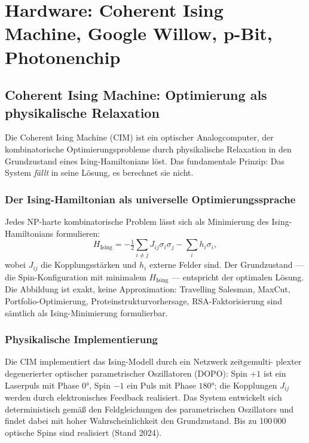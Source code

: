 \chapter{Hardware: Coherent Ising Machine, Google Willow, p-Bit, Photonenchip}
\label{ch:hardware}

\section{Coherent Ising Machine: Optimierung als physikalische Relaxation}

Die Coherent Ising Machine (CIM) ist ein optischer Analogcomputer, der
kombinatorische Optimierungsprobleme durch physikalische Relaxation in
den Grundzustand eines Ising-Hamiltonians löst. Das fundamentale Prinzip:
Das System \emph{fällt} in seine Lösung, es berechnet sie nicht.

\subsection*{Der Ising-Hamiltonian als universelle Optimierungssprache}

Jedes NP-harte kombinatorische Problem lässt sich als Minimierung des
Ising-Hamiltonians formulieren:
\begin{equation}
  H_{\mathrm{Ising}} = -\tfrac12\sum_{i\ne j}J_{ij}\sigma_i\sigma_j
  - \sum_i h_i\sigma_i,
\end{equation}
wobei $J_{ij}$ die Kopplungsstärken und $h_i$ externe Felder sind.
Der Grundzustand --- die Spin-Konfiguration mit minimalem $H_{\mathrm{Ising}}$
--- entspricht der optimalen Lösung. Die Abbildung ist exakt, keine
Approximation: Travelling Salesman, MaxCut, Portfolio-Optimierung,
Proteinstrukturvorhersage, RSA-Faktorisierung sind sämtlich als
Ising-Minimierung formulierbar.

\subsection*{Physikalische Implementierung}

Die CIM implementiert das Ising-Modell durch ein Netzwerk zeitgemulti-
plexter degenerierter optischer parametrischer Oszillatoren (DOPO):
Spin $+1$ ist ein Laserpuls mit Phase $0°$, Spin $-1$ ein Puls mit
Phase $180°$; die Kopplungen $J_{ij}$ werden durch elektronisches
Feedback realisiert. Das System entwickelt sich deterministisch gemäß
den Feldgleichungen des parametrischen Oszillators und findet dabei mit
hoher Wahrscheinlichkeit den Grundzustand. Bis zu 100\,000 optische
Spins sind realisiert (Stand 2024).

